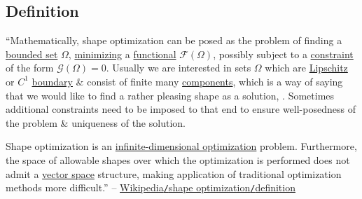 \documentclass[oneside]{book}
\numberwithin{equation}{section}
\begin{document}
\subsection{Definition}
``Mathematically, shape optimization can be posed as the problem of finding a \href{https://en.wikipedia.org/wiki/Bounded_set}{bounded set} $\Omega$, \href{https://en.wikipedia.org/wiki/Maxima_and_minima}{minimizing} a \href{https://en.wikipedia.org/wiki/Functional_(mathematics)}{functional} $\mathcal{F}(\Omega)$, possibly subject to a \href{https://en.wikipedia.org/wiki/Constraint_(mathematics)}{constraint} of the form $\mathcal{G}(\Omega) = 0$. Usually we are interested in sets $\Omega$ which are \href{https://en.wikipedia.org/wiki/Lipschitz_continuity}{Lipschitz} or $C^1$ \href{https://en.wikipedia.org/wiki/Boundary_(topology)}{boundary} \& consist of finite many \href{https://en.wikipedia.org/wiki/Connected_component_(analysis)}{components}, which is a way of saying that we would like to find a rather pleasing shape as a solution, . Sometimes additional constraints need to be imposed to that end to ensure well-posedness of the problem \& uniqueness of the solution.

Shape optimization is an \href{https://en.wikipedia.org/wiki/Infinite-dimensional_optimization}{infinite-dimensional optimization} problem. Furthermore, the space of allowable shapes over which the optimization is performed does not admit a \href{https://en.wikipedia.org/wiki/Vector_space}{vector space} structure, making application of traditional optimization methods more difficult.'' -- \href{https://en.wikipedia.org/wiki/Shape_optimization#Definition}{Wikipedia\texttt{/}shape optimization\texttt{/}definition}
\end{document}
